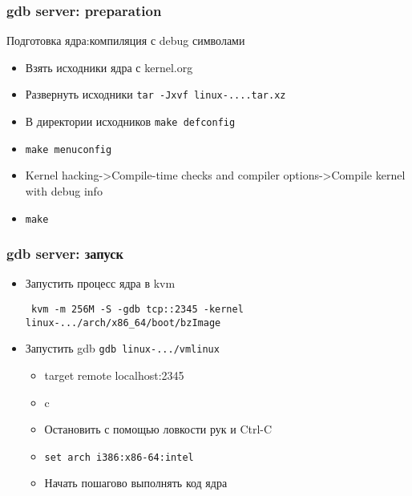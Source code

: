 \begin{frame}
  \frametitle{gdb server: preparation}
  \begin{center}
    {\large Подготовка ядра:компиляция с debug символами}
  \end{center}
  \begin{itemize}
    \item Взять исходники ядра с kernel.org
    \item Развернуть исходники \texttt{tar -Jxvf linux-....tar.xz}
    \item В директории исходников \texttt{make defconfig}
    \item \texttt{make menuconfig}
    \item Kernel hacking->Compile-time checks and compiler options->Compile kernel with debug info
    \item \texttt{make}
  \end{itemize}
\end{frame}

\begin{frame}
  \frametitle{gdb server: запуск}
\begin{itemize}
    \item Запустить процесс ядра в kvm

      \texttt{ kvm -m 256M -S -gdb tcp::2345 -kernel linux-.../arch/x86\_64/boot/bzImage }
    \item Запустить gdb \texttt{gdb linux-.../vmlinux}
    \begin{itemize}
      \item target remote localhost:2345
      \item c
      \item Остановить с помощью ловкости рук и Ctrl-C
      \item \texttt{set arch i386:x86-64:intel}
      \item Начать пошагово выполнять код ядра
    \end{itemize}
\end{itemize}
\end{frame}
